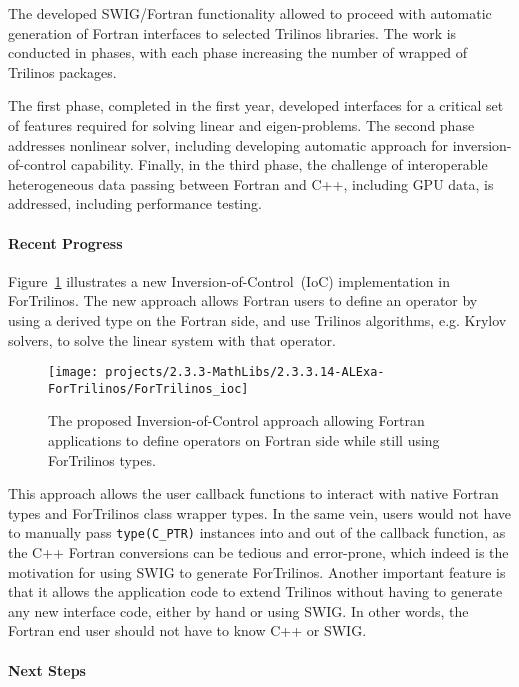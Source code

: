 The developed SWIG/Fortran functionality allowed to proceed with automatic generation of Fortran interfaces to selected Trilinos libraries. The work is conducted in phases, with each phase increasing the number of wrapped of Trilinos packages.

The first phase, completed in the first year, developed interfaces for a critical set of features required for solving linear and eigen-problems. The second phase addresses nonlinear solver, including developing automatic approach for inversion-of-control capability. Finally, in the third phase, the challenge of interoperable heterogeneous data passing between Fortran and C++, including GPU data, is addressed, including performance testing.

\paragraph{Recent Progress}

Figure~\ref{fig:fortran_ioc} illustrates a new Inversion-of-Control~(IoC)
implementation in ForTrilinos. The new approach allows Fortran users to define
an operator by using a derived type on the Fortran side, and use Trilinos
algorithms, e.g. Krylov solvers, to solve the linear system with that operator.

\begin{figure}[htb]
    \centering
    \texttt{[image: projects/2.3.3-MathLibs/2.3.3.14-ALExa-ForTrilinos/ForTrilinos\_ioc]}
    \caption{\label{fig:fortran_ioc}The proposed Inversion-of-Control approach
    allowing Fortran applications to define operators on Fortran side while
    still using ForTrilinos types.}
\end{figure}

This approach allows the user callback functions to interact with native Fortran
types and ForTrilinos class wrapper types. In the same vein, users would not
have to manually pass \texttt{type(C\_PTR)} instances into and out of the
callback function, as the C++ Fortran conversions can be tedious and
error-prone, which indeed is the motivation for using SWIG to generate
ForTrilinos.  Another important feature is that it allows the application code
to extend Trilinos without having to generate any new interface code, either by
hand or using SWIG. In other words, the Fortran end user should not have to know
C++ or SWIG.

\paragraph{Next Steps}


